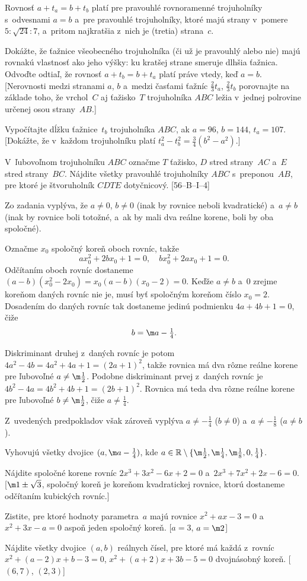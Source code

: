 {\zaver
Rovnosť $a+t_a=b+t_b$ platí pre pravouhlé
rovnoramenné trojuholníky s~odvesnami $a=b$ a~pre pravouhlé
trojuholníky, ktoré majú strany v~pomere $5:\sqrt{24}:7$,
a~pritom najkratšia z~nich je (tretia) strana~$c$.

Dokážte, že ťažnice všeobecného trojuholníka
(či už je pravouhlý alebo nie) majú rovnakú vlastnosť ako jeho
výšky: ku kratšej strane smeruje dlhšia ťažnica. Odvoďte odtiaľ, že
rovnosť $a+t_b=b+t_a$ platí práve vtedy, keď $a=b$.
[Nerovnosti medzi
stranami $a$, $b$ a~medzi časťami ťažníc $\frac23t_a$, $\frac23t_b$
porovnajte na
základe toho, že vrchol~$C$ aj ťažisko~$T$ trojuholníka $ABC$ ležia
v~jednej polrovine určenej osou strany~$AB$.]

Vypočítajte dĺžku ťažnice~$t_b$ trojuholníka $ABC$, ak
$a=96$, $b=144$, $t_a=107$.
[Dokážte, že v~každom trojuholníku platí
$t_a^2-t_b^2=\frac34(b^2-a^2)$.]

\D%
V~ľubovoľnom trojuholníku $ABC$ označme $T$ ťažisko, $D$
stred strany~$AC$ a~$E$ stred strany~$BC$. Nájdite všetky
pravouhlé trojuholníky $ABC$ s~preponou~$AB$, pre ktoré je
štvoruholník $CDTE$ dotyčnicový. [56--B--I--4]
}

{%
Zo zadania vyplýva, že $a\ne0$, $b\ne0$ (inak by rovnice
neboli kvadratické) a~$a\ne b$ (inak by rovnice boli totožné,
a~ak by mali dva reálne korene, boli by oba spoločné).

Označme $x_0$ spoločný koreň oboch rovníc, takže
$$
ax_0^2+2bx_0+1=0,\quad bx_0^2+2ax_0+1=0.
$$
Odčítaním oboch rovníc dostaneme
$(a-b)(x_0^2-2x_0)=x_0(a-b)(x_0-2)=0$.
Keďže $a\ne b$ a~$0$ zrejme koreňom
daných rovníc nie je, musí byť spoločným koreňom číslo $x_0=2$.
Dosadením do daných rovníc tak dostaneme jedinú podmienku
$4a+4b+1=0$, čiže
$$
b=\m a-\tfrac14.
$$

Diskriminant druhej z~daných rovníc je potom
$4a^2-4b=4a^2+4a+1=(2a+1)^2$, takže rovnica má dva rôzne
reálne korene pre ľubovoľné $a\ne\m\frac12$.
Podobne
diskriminant prvej z~daných rovníc je
$4b^2-4a=4b^2+4b+1=(2b+1)^2$. Rovnica má teda dva rôzne
reálne korene pre ľubovoľné $b\ne\m\frac12$, čiže $a\ne\frac14$.

Z~uvedených predpokladov však zároveň vyplýva $a\ne-\frac14$ ($b\ne0$) a~$a\ne-\frac18$ ($a\ne b$).

\zaver
Vyhovujú všetky dvojice $(a, \m a-\frac14)$, kde
$a\in\Bbb R\setminus\{\m\frac12, \m\frac14, \m\frac18, 0, \frac14\}$.

Nájdite spoločné korene rovníc $2x^3+3x^2-6x+2=0$
a~$2x^3+7x^2+2x-6=0$. [$\m1\pm\sqrt3$, spoločný koreň je koreňom
kvadratickej rovnice, ktorú dostaneme odčítaním kubických rovníc.]

Zistite, pre ktoré hodnoty parametra~$a$ majú rovnice
$x^2+ax-3=0$ a~$x^2+3x-a=0$ aspoň jeden spoločný koreň.
[$a=3$, $a=\m2$]

Nájdite všetky dvojice $(a,b)$ reálnych čísel, pre ktoré má
každá z~rovníc $x^2+(a-2)x+b-3=0$, $x^2+(a+2)x+3b-5=0$
dvojnásobný koreň. [$(6,7)$, $(2,3)$]
}

